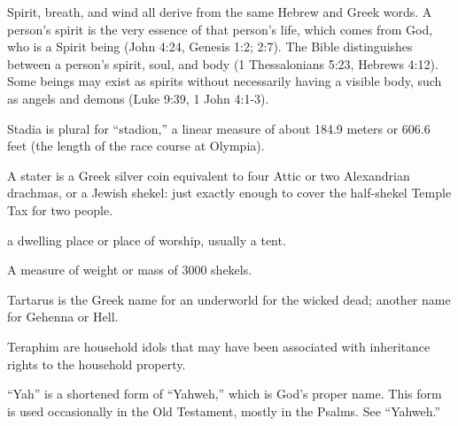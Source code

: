 {\par }{
\par }{\ILIB Spirit, breath, and wind all derive from the same Hebrew and Greek words. A person’s spirit is the very essence of that person’s life, which comes from God, who is a Spirit being (John 4:24, Genesis 1:2; 2:7). The Bible distinguishes between a person’s spirit, soul, and body (1 Thessalonians 5:23, Hebrews 4:12). Some beings may exist as spirits without necessarily having a visible body, such as angels and demons (Luke 9:39, 1 John 4:1-3).
\par }{
\par }{\ILIB Stadia is plural for “stadion,” a linear measure of about 184.9 meters or 606.6 feet (the length of the race course at Olympia).
\par }{
\par }{\ILIB A stater is a Greek silver coin equivalent to four Attic or two Alexandrian drachmas, or a Jewish shekel: just exactly enough to cover the half-shekel Temple Tax for two people.
\par }{
\par }{\ILIB a dwelling place or place of worship, usually a tent.
\par }{
\par }{\ILIB A measure of weight or mass of 3000 shekels.
\par }{
\par }{\ILIB Tartarus is the Greek name for an underworld for the wicked dead; another name for Gehenna or Hell.
\par }{
\par }{\ILIB Teraphim are household idols that may have been associated with inheritance rights to the household property.
\par }{
\par }{\ILIB “Yah” is a shortened form of “Yahweh,” which is God’s proper name. This form is used occasionally in the Old Testament, mostly in the Psalms. See “Yahweh.”
\par }{
}
